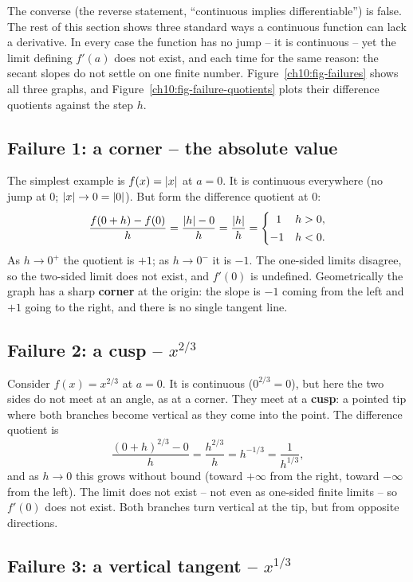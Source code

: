 The converse (the reverse statement, ``continuous implies differentiable'') is
false. The rest of this section shows three standard ways a continuous function
can lack a derivative. In every case the function has no jump -- it is
continuous -- yet the limit defining $f'(a)$ does not exist, and each time for
the same reason: the secant slopes do not settle on one finite number.
Figure~\ref{ch10:fig-failures} shows all three graphs, and
Figure~\ref{ch10:fig-failure-quotients} plots their difference quotients
against the step $h$.

\subsection*{Failure 1: a corner -- the absolute value}

The simplest example is $f(x) = \lvert x\rvert$ at $a = 0$. It is continuous everywhere
(no jump at $0$; $\lvert x\rvert \to 0 = \lvert0\rvert$). But form the difference quotient at
$0$:
\[
  \frac{f(0 + h) - f(0)}{h} = \frac{\lvert h\rvert - 0}{h} = \frac{\lvert h\rvert}{h}
  = \begin{cases} \;\;1 & h > 0, \\[2pt] -1 & h < 0. \end{cases}
\]
As $h \to 0^+$ the quotient is $+1$; as $h \to 0^-$ it is $-1$. The one-sided
limits disagree, so the two-sided limit does not exist, and $f'(0)$ is undefined.
Geometrically the graph has a sharp \textbf{corner} at the origin: the slope is
$-1$ coming from the left and $+1$ going to the right, and there is no single
tangent line.

\subsection*{Failure 2: a cusp -- $x^{2/3}$}

Consider $f(x) = x^{2/3}$ at $a = 0$. It is continuous ($0^{2/3} = 0$), but here
the two sides do not meet at an angle, as at a corner. They meet at a
\textbf{cusp}: a pointed tip where both branches become vertical as they come
into the point. The difference quotient is
\[
  \frac{(0+h)^{2/3} - 0}{h} = \frac{h^{2/3}}{h} = h^{-1/3} = \frac{1}{h^{1/3}},
\]
and as $h \to 0$ this grows without bound (toward $+\infty$ from the right, toward
$-\infty$ from the left). The limit does not exist -- not even as one-sided finite
limits -- so $f'(0)$ does not exist. Both branches turn vertical at the tip,
but from opposite directions.

\subsection*{Failure 3: a vertical tangent -- $x^{1/3}$}

